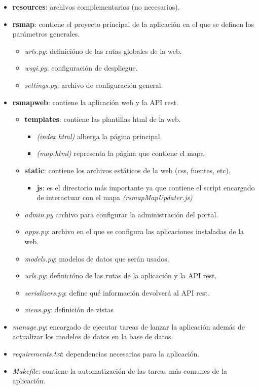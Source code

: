\begin{itemize}
  \item \textbf{resources}: archivos complementarios (no necesarios).
  \item \textbf{rsmap}: contiene el proyecto principal de la aplicación en el que se definen los parámetros generales.
  \begin{itemize}
      \item \textit{urls.py}: definicióno de las rutas globales de la web.
      \item \textit{wsgi.py}: configuración de despliegue.
      \item \textit{settings.py}: archivo de configuración general.
  \end{itemize}
  \item \textbf{rsmapweb}: contiene la aplicación web y la API rest.
  \begin{itemize}
    \item \textbf{templates}: contiene las plantillas html de la web.
    \begin{itemize}
      \item \textit{(index.html)} alberga la página principal.
      \item \textit{(map.html)} representa la página que contiene el mapa.
    \end{itemize}
    \item \textbf{static}: contiene los archivos estáticos de la web (css, fuentes, etc).
      \begin{itemize}
        \item \textbf{js}: es el directorio más importante ya que contiene el script encargado de interactuar con el mapa \textit{(rsmapMapUpdater.js)}
      \end{itemize}
    \item \textit{admin.py} archivo para configurar la administración del portal.
    \item \textit{apps.py}: archivo en el que se configura las aplicaciones instaladas de la web.
    \item \textit{models.py}: modelos de datos que serán usados.
    \item \textit{urls.py}: definicióno de las rutas de la aplicación y la API rest.
    \item \textit{serializers.py}: define qué información devolverá al API rest.
    \item \textit{views.py}: definición de vistas
  \end{itemize}
    \item \textit{manage.py}: encargado de ejecutar tareas de lanzar la aplicación además de actualizar los modelos de datos en la base de datos.
    \item \textit{requirements.txt}: dependencias necesarias para la aplicación.
    \item \textit{Makefile}: contiene la automatización de las tareas más comunes de la aplicación.
\end{itemize}

